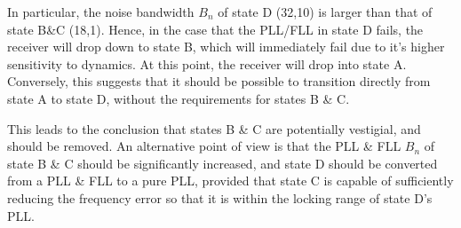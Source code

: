 In particular, the noise bandwidth $B_n$ of state D (32,10) is larger than that of state B\&C (18,1). Hence, in the case that the PLL/FLL in state D fails, the receiver will drop down to state B, which will immediately fail due to it's higher sensitivity to dynamics. At this point, the receiver will drop into state A. Conversely, this suggests that it should be possible to transition  directly from state A to state D, without the requirements for states B \& C. 

This leads to the conclusion that states B \& C are potentially vestigial, and should be removed. An alternative point of view is that the PLL \& FLL $B_n$ of state B \& C should be significantly increased, and state D should be converted from a PLL \& FLL to a pure PLL, provided that state C is capable of sufficiently reducing the frequency error so that it is within the locking range of state D's PLL.

